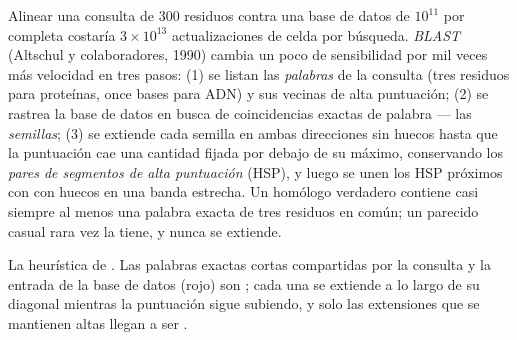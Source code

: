\begin{definition}[BLAST]\label{def:b3:bioinformatics:blast}
Alinear una consulta de \num{300} residuos contra una base de datos de
$10^{11}$ por  completa costaría $3\times 10^{13}$
actualizaciones de celda por búsqueda. \emph{BLAST} (Altschul y
colaboradores, 1990) cambia un poco de sensibilidad por mil veces más
velocidad en tres pasos: (1) se listan las \emph{palabras} de la consulta
(tres residuos para proteínas, once bases para ADN) y sus vecinas de alta
puntuación; (2) se rastrea la base de datos en busca de coincidencias
exactas de palabra --- las \emph{semillas}; (3) se extiende cada semilla
en ambas direcciones sin huecos hasta que la puntuación cae una cantidad
fijada por debajo de su máximo, conservando los \emph{pares de segmentos
de alta puntuación} (HSP), y luego se unen los HSP próximos con
 con huecos en una banda estrecha. Un homólogo
verdadero contiene casi siempre al menos una palabra exacta de tres
residuos en común; un parecido casual rara vez la tiene, y nunca se
extiende.
\end{definition}

\begin{omfigure}

{\small La heurística de . Las palabras exactas cortas compartidas
por la consulta y la entrada de la base de datos (rojo) son ;
cada una se extiende a lo largo de su diagonal mientras la puntuación
sigue subiendo, y solo las extensiones que se mantienen altas llegan a
ser .}
\end{omfigure}

